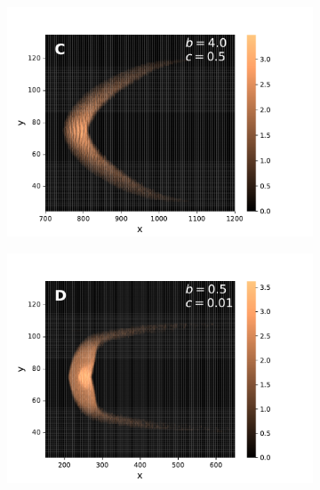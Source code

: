 \documentclass[11pt,twocolumn,twoside]{opticajnl}
\begin{document}
\begin{figure}[t]
\begin{subfigure}[b]{0.3\linewidth}
         \includegraphics[width=1.1\textwidth]{Figuras/C.pdf}
         \label{fig:C}
     \end{subfigure}
          \begin{subfigure}[b]{0.3\linewidth}
          \raggedleft
         \includegraphics[width=1.1\textwidth]{Figuras/D.pdf}
         \label{fig:D}
     \end{subfigure}
          \begin{subfigure}[b]{0.3\linewidth}
          \centering

\end{subfigure}
\end{figure}
\end{document}
